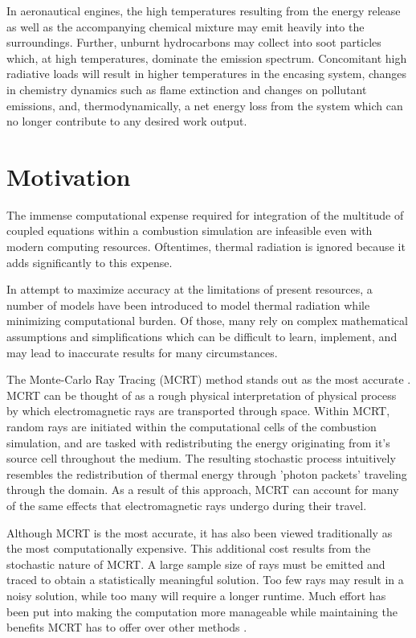 In aeronautical engines, the high temperatures resulting from the energy release as well as the accompanying chemical mixture may emit heavily into the surroundings. Further, unburnt hydrocarbons may collect into soot particles which, at high temperatures, dominate the emission spectrum.
Concomitant high radiative loads will result in higher temperatures in the encasing system, changes in chemistry dynamics such as flame extinction and changes on pollutant emissions, and, thermodynamically, a net energy loss from the system which can no longer contribute to any desired work output.


\section{Motivation}
The immense computational expense required for integration of the multitude of coupled equations within a combustion simulation are infeasible even with modern computing resources. Oftentimes, thermal radiation is ignored because it adds significantly to this expense.

In attempt to maximize accuracy at the limitations of present resources, a number of models have been introduced to model thermal radiation while minimizing computational burden.
Of those, many rely on complex mathematical assumptions and simplifications which can be difficult to learn, implement, and may lead to inaccurate results for many circumstances. 


The Monte-Carlo Ray Tracing (MCRT) method stands out as the most accurate \cite{Tesse2002RadiativeApproach,Modest2013RadiativeTransfer,Coelho2018RadiativeSystems}. 
MCRT can be thought of as a rough physical interpretation of physical process by which electromagnetic rays are transported through space.
Within MCRT, random rays are initiated within the computational cells of the combustion simulation, and are tasked with redistributing the energy originating from it's source cell throughout the medium. The resulting stochastic process intuitively resembles the redistribution of thermal energy through 'photon packets' traveling through the domain.
As a result of this approach, MCRT can account for many of the same effects that electromagnetic rays undergo during their travel.

Although MCRT is the most accurate, it has also been viewed traditionally as the most computationally expensive.
This additional cost results from the stochastic nature of MCRT. A large sample size of rays must be emitted and traced to obtain a statistically meaningful solution. 
Too few rays may result in a noisy solution, while too many will require a longer runtime.
Much effort has been put into making the computation more manageable while maintaining the benefits MCRT has to offer over other methods \cite{Liu2020TheFlames,Tesse2002RadiativeApproach,Zeeb2001AnGeometries,Modest2003BackwardTransfer,Howell2010ThermalTransfer}.

